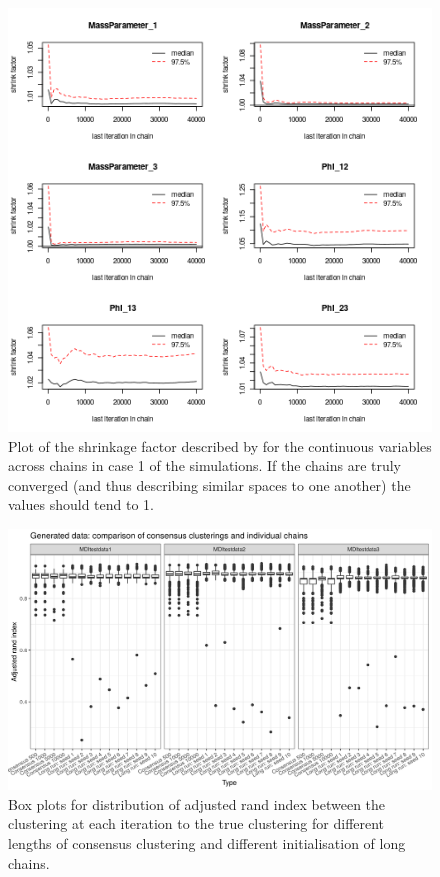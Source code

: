 \documentclass[12pt]{article} %
\begin{document}
	\begin{figure}[h]
			\centering
			\includegraphics[scale=0.65]{Images/Gen_data/Case_1/Gelman_plot.png}
			\caption{Plot of the shrinkage factor described by \citet{GelmanInferenceIterativeSimulation1992} for the continuous variables across chains in case 1 of the simulations. If the chains are truly converged (and thus describing similar spaces to one another) the values should tend to 1.}
			\label{fig:gen_data_case_1_gelman_plot}
		\end{figure}

	\newpage
	
		\begin{figure}
			\centering
			\includegraphics[scale=0.9]{Images/Gen_data/Case_1/box_plot_ari_true_clustering.png}
			\caption{Box plots for distribution of adjusted rand index between the clustering at each iteration to the true clustering for different lengths of consensus clustering and different initialisation of long chains.}
			\label{fig:gen_data_case_1_boxplot}
		\end{figure}
		
\end{document}
